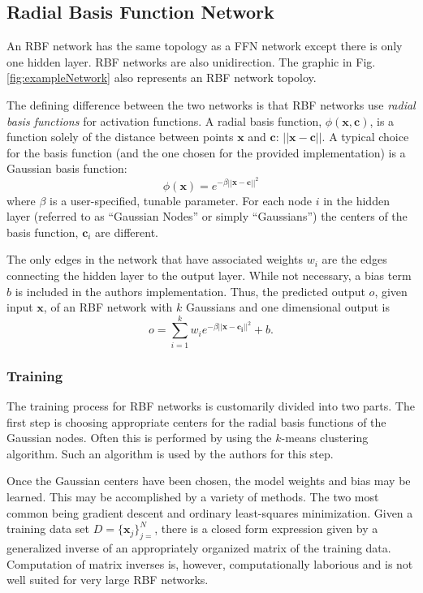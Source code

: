 \documentclass[conference]{IEEEtran}
\begin{document}
  \subsection{Radial Basis Function Network}
  An RBF network has the same topology as a FFN network except there is only one hidden layer. RBF networks are also unidirection. The graphic in Fig. \ref{fig:exampleNetwork} also represents an RBF network topoloy.

  The defining difference between the two networks is that RBF networks use \textit{radial basis functions} for activation functions. A radial basis function, $\phi(\mathbf{x}, \mathbf{c})$, is a function solely of the distance between points $\mathbf{x}$ and $\mathbf{c}$: $||\mathbf{x} - \mathbf{c}||$. A typical choice for the basis function (and the one chosen for the provided implementation) is a Gaussian basis function:
  \begin{equation} \label{eq:rbf}
    \phi(\mathbf{x}) = e^{-\beta ||\mathbf{x} - \mathbf{c}||^2}
  \end{equation}
  where $\beta$ is a user-specified, tunable parameter.
  For each node $i$ in the hidden layer (referred to as ``Gaussian Nodes'' or simply ``Gaussians'') the centers of the basis function, $\mathbf{c}_i$ are different.

  The only edges in the network that have associated weights $w_i$ are the edges connecting the hidden layer to the output layer. While not necessary, a bias term $b$ is included in the authors implementation. Thus, the predicted output $o$, given input $\mathbf{x}$, of an RBF network with $k$ Gaussians and one dimensional output is
  $$
  o = \sum_{i=1}^k w_i e^{-\beta ||\mathbf{x} - \mathbf{c_i}||^2} + b.
  $$
  
    \subsubsection{Training}
    The training process for RBF networks is customarily divided into two parts. The first step is choosing appropriate centers for the radial basis functions of the Gaussian nodes. Often this is performed by using the $k$-means clustering algorithm. Such an algorithm is used by the authors for this step.

    Once the Gaussian centers have been chosen, the model weights and bias may be learned. This may be accomplished by a variety of methods. The two most common being gradient descent and ordinary least-squares minimization. Given a training data set $D = \{\mathbf{x}_j\}_{j=}^N$, there is a closed form expression given by a generalized inverse of an appropriately organized matrix of the training data. Computation of matrix inverses is, however, computationally laborious and is not well suited for very large RBF networks.
\end{document}
